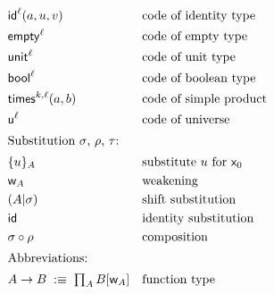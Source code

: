 \begin{align*}
 & \uniId{\ell}{a}{u}{v} &&\text{code of identity type} \\
 & \uniEmpty{\ell} &&\text{code of empty type} \\
 & \uniUnit{\ell} &&\text{code of unit type} \\
 & \uniBool{\ell} &&\text{code of boolean type} \\
 & \uniSimProd{k}{\ell}{a}{b} &&\text{code of simple product} \\
 & \uniUni{\ell} &&\text{code of universe} \\
%
\intertext{Substitution $\sigma$, $\rho$, $\tau$:}
%
 & \sbzero{A}{u} &&\text{substitute $u$ for $\var{0}$} \\
 & \sbweak{A} &&\text{weakening} \\
 & \sbshift{\sigma}{A} &&\text{shift substitution} \\
 & \sbid &&\text{identity substitution} \\
 & \sbcomp{\sigma}{\rho} &&\text{composition} \\
%
\intertext{Abbreviations:}
%
  &A \to B \defequiv \Prod{A}{\Subst{B}{\sbweak{A}}} &&\text{function type}
\end{align*}
